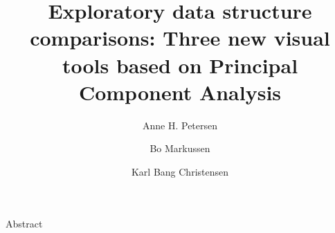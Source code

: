 \documentclass[titlepage,11pt,twoside]{article}
\begin{document}
\begin{titlepage}

\title{Exploratory data structure comparisons: Three new visual tools based on Principal Component Analysis}

\author{Anne H. Petersen}

\author{Bo Markussen}

\author{Karl Bang Christensen}

\vspace{\fill}

\end{titlepage}\vspace*{24pt}




\begin{center}\vskip3pt

\vspace{32pt}

Abstract\vskip3pt

\end{center}
\end{document}
